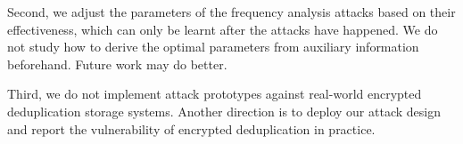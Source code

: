  Second, we adjust the parameters of the frequency analysis attacks based on their effectiveness, which can only be learnt after the attacks have happened. We do not study how to derive the optimal parameters from auxiliary information beforehand. Future work may do better. 
 


Third, we do not implement  attack prototypes against real-world encrypted deduplication storage systems. Another direction is to deploy our attack design and 
report the vulnerability of encrypted deduplication in practice.


